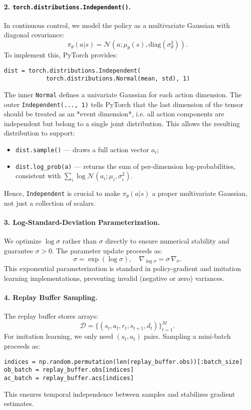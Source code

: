 \documentclass[12pt]{article}
\begin{document}
\paragraph{2. \texttt{torch.distributions.Independent()}.}
In continuous control, we model the policy as a multivariate Gaussian with diagonal covariance:
\[
\pi_\theta(a|s) = \mathcal{N}(a; \mu_\theta(s), \text{diag}(\sigma_\theta^2)).
\]
To implement this, PyTorch provides:
\begin{verbatim}
dist = torch.distributions.Independent(
            torch.distributions.Normal(mean, std), 1)
\end{verbatim}
The inner \texttt{Normal} defines a univariate Gaussian for each action dimension.
The outer \texttt{Independent(..., 1)} tells PyTorch that the last dimension of the tensor
should be treated as an *event dimension*, i.e. all action components are independent but belong
to a single joint distribution.  
This allows the resulting distribution to support:
\begin{itemize}
  \item \texttt{dist.sample()} — draws a full action vector $a_t$;
  \item \texttt{dist.log\_prob(a)} — returns the sum of per-dimension log-probabilities,
        consistent with $\sum_i \log \mathcal{N}(a_i; \mu_i, \sigma_i^2)$.
\end{itemize}
Hence, \texttt{Independent} is crucial to make $\pi_\theta(a|s)$ a proper multivariate Gaussian,
not just a collection of scalars.

\paragraph{3. Log-Standard-Deviation Parameterization.}
We optimize $\log \sigma$ rather than $\sigma$ directly to ensure numerical stability
and guarantee $\sigma > 0$.  
The parameter update proceeds as:
\[
\sigma = \exp(\log \sigma), \quad
\nabla_{\log \sigma} = \sigma \, \nabla_{\sigma}.
\]
This exponential parameterization is standard in policy-gradient and imitation learning implementations,
preventing invalid (negative or zero) variances.

\paragraph{4. Replay Buffer Sampling.}
The replay buffer stores arrays:
\[
\mathcal{D} = \{(s_t, a_t, r_t, s_{t+1}, d_t)\}_{t=1}^M.
\]
For imitation learning, we only need $(s_t, a_t)$ pairs.  
Sampling a mini-batch proceeds as:
\begin{verbatim}
indices = np.random.permutation(len(replay_buffer.obs))[:batch_size]
ob_batch = replay_buffer.obs[indices]
ac_batch = replay_buffer.acs[indices]
\end{verbatim}
This ensures temporal independence between samples and stabilizes gradient estimates.
\end{document}

